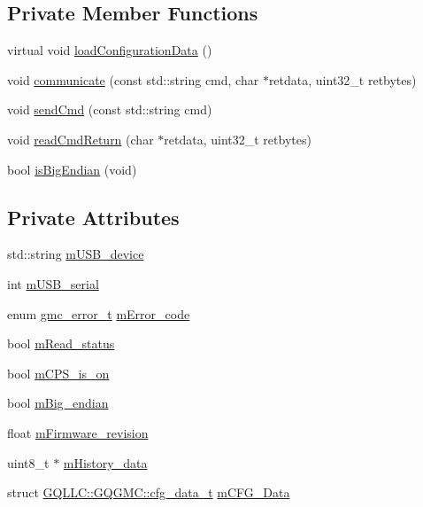 \subsection*{\-Private \-Member \-Functions}
\begin{DoxyCompactItemize}
\item 
virtual void \hyperlink{class_g_q_l_l_c_1_1_g_q_g_m_c_af3fd689594985d9b4ec7e7bb8b0538e5}{load\-Configuration\-Data} ()
\item 
void \hyperlink{class_g_q_l_l_c_1_1_g_q_g_m_c_a0591bde39a2ad37dfd2049354f8f4406}{communicate} (const std\-::string cmd, char $\ast$retdata, uint32\-\_\-t retbytes)
\item 
void \hyperlink{class_g_q_l_l_c_1_1_g_q_g_m_c_ac7334219851b3dfa227183682d15264c}{send\-Cmd} (const std\-::string cmd)
\item 
void \hyperlink{class_g_q_l_l_c_1_1_g_q_g_m_c_a4718ddfc86ddd4a73bcf161ad3c5ac68}{read\-Cmd\-Return} (char $\ast$retdata, uint32\-\_\-t retbytes)
\item 
bool \hyperlink{class_g_q_l_l_c_1_1_g_q_g_m_c_aef63b9e44e8602ade9ec5ad021c22a88}{is\-Big\-Endian} (void)
\end{DoxyCompactItemize}
\subsection*{\-Private \-Attributes}
\begin{DoxyCompactItemize}
\item 
std\-::string \hyperlink{class_g_q_l_l_c_1_1_g_q_g_m_c_a358fe79ef3338d88ab193ca5f17d3770}{m\-U\-S\-B\-\_\-device}
\item 
int \hyperlink{class_g_q_l_l_c_1_1_g_q_g_m_c_a5ff48a1e65964a979867d1eba2eb58b5}{m\-U\-S\-B\-\_\-serial}
\item 
enum \hyperlink{namespace_g_q_l_l_c_a26199f442b869bff06756c6bc1a9f892}{gmc\-\_\-error\-\_\-t} \hyperlink{class_g_q_l_l_c_1_1_g_q_g_m_c_aed89a460a261ff18ed427218b60b472d}{m\-Error\-\_\-code}
\item 
bool \hyperlink{class_g_q_l_l_c_1_1_g_q_g_m_c_a31e866e262a7ea1c6aac19e3c848f2ab}{m\-Read\-\_\-status}
\item 
bool \hyperlink{class_g_q_l_l_c_1_1_g_q_g_m_c_adb2392500e4da8e8bb520171b637b68e}{m\-C\-P\-S\-\_\-is\-\_\-on}
\item 
bool \hyperlink{class_g_q_l_l_c_1_1_g_q_g_m_c_ae6d4705add2c6440660440b70a515a69}{m\-Big\-\_\-endian}
\item 
float \hyperlink{class_g_q_l_l_c_1_1_g_q_g_m_c_a1f3457f4a8e3bb57319a833f469273f8}{m\-Firmware\-\_\-revision}
\item 
uint8\-\_\-t $\ast$ \hyperlink{class_g_q_l_l_c_1_1_g_q_g_m_c_a5bd26eaef22d27553f06e369f5e40a8e}{m\-History\-\_\-data}
\item 
struct \hyperlink{struct_g_q_l_l_c_1_1_g_q_g_m_c_1_1cfg__data__t}{\-G\-Q\-L\-L\-C\-::\-G\-Q\-G\-M\-C\-::cfg\-\_\-data\-\_\-t} \hyperlink{class_g_q_l_l_c_1_1_g_q_g_m_c_a5a11e2149e670bfb9e93814213a33b08}{m\-C\-F\-G\-\_\-\-Data}
\end{DoxyCompactItemize}


